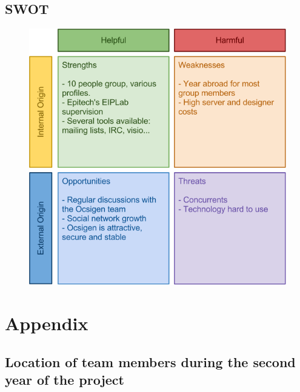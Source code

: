 \documentclass {life-en}
\begin{document}
\section{SWOT}

\begin{figure} [H]
  \begin{center}
    \includegraphics [width = 14cm]{img/swot_en.png}
  \end{center}
\end{figure}


\chapter{Appendix}

\section{Location of team members during the second year of the project}
\end{document}
